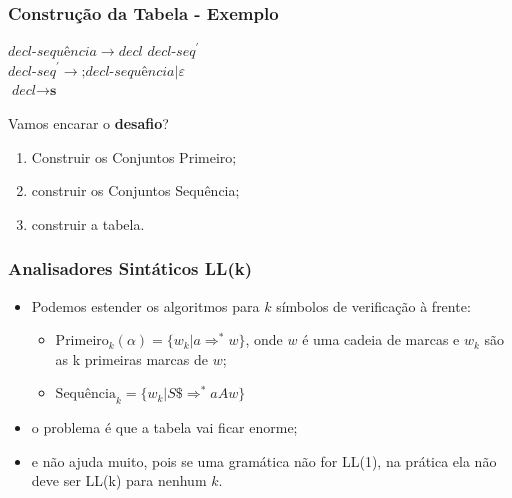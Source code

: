 \documentclass[table]{beamer}
\begin{document}
\begin{frame}
   \frametitle{Construção da Tabela - Exemplo}
   $\textit{decl-sequência} \to decl \textit{ decl-seq}^{'}$ \\
   $\textit{decl-seq}^{'} \to \textbf{;} \textit{decl-sequência} | \varepsilon$ \\
   $\textit{decl} \to \textbf{s}$ \\
   \begin{center}
   Vamos encarar o \textbf{desafio}?
   \end{center}
   \begin{enumerate}
      \item Construir os Conjuntos Primeiro;
      \item construir os Conjuntos Sequência;
      \item construir a tabela.
   \end{enumerate}
\end{frame}

\begin{frame}
   \frametitle{Analisadores Sintáticos LL(k)}
   \begin{itemize}
      \item Podemos estender os algoritmos para $k$ símbolos de verificação à frente:
      \begin{itemize}
         \item $\text{Primeiro}_{k}(\alpha)=\{w_{k}|a{\Rightarrow}^{*} w\}$, onde $w$ é uma cadeia de marcas e $w_{k}$ são as k primeiras marcas de $w$;
	 \item $\text{Sequência}_{k}=\{w_{k}|S\${\Rightarrow}^{*} aAw \}$
      \end{itemize}
      \item o problema é que a tabela vai ficar enorme;
      \item e não ajuda muito, pois se uma gramática não for LL(1), na prática ela não deve ser LL(k) para nenhum $k$.
   \end{itemize}
\end{frame}
\end{document}
